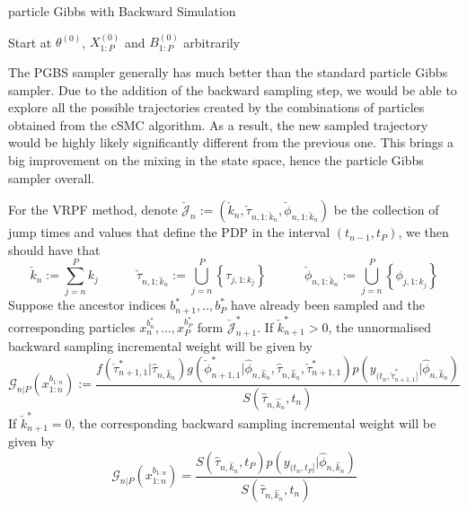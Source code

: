 \documentclass[12pt,a4paper]{article}
\begin{document}
\begin{algorithm}[htb!]
    \caption{particle Gibbs with Backward Simulation}\label{Alg: PGBSi}
    Start at $\theta^{(0)}$, $X_{1:P}^{(0)}$ and $B_{1:P}^{(0)}$ arbitrarily\;
\end{algorithm}
The PGBS sampler generally has much better than the standard particle Gibbs sampler. Due to the addition of the backward sampling step, we would be able to explore all the possible trajectories created by the combinations of particles obtained from the cSMC algorithm. As a result, the new sampled trajectory would be highly likely significantly different from the previous one. This brings a big improvement on the mixing in the state space, hence the particle Gibbs sampler overall. 

For the VRPF method, denote \(\check{\mathcal{J}}_{n}:=(\check{k}_n,\check{\tau}_{n,1:\check{k}_n},\check{\phi}_{n,1:\check{k}_n})\) be the collection of jump times and values that define the PDP in the interval \((t_{n-1},t_P)\), we then should have that 
\begin{equation*}
    \check{k}_n := \sum_{j=n}^{P} k_j \quad\quad\quad \check{\tau}_{n,1:\check{k}_n} :=  \bigcup_{j=n}^{P} \left\{\tau_{j,1:k_j}\right\} \quad\quad\quad \check{\phi}_{n,1:\check{k}_n} :=  \bigcup_{j=n}^{P} \left\{\phi_{j,1:k_j}\right\}
\end{equation*}
Suppose the ancestor indices $b_{n+1}^{*},..,b_P^{*}$ have already been sampled and the corresponding particles \(x_{n}^{b_n^*},...,x_P^{b_P^*}\) form $\check{\mathcal{J}}_{n+1}^{*}$. If $\check{k}_{n+1}^{*}>0$, the unnormalised backward sampling incremental weight will be given by 
\begin{equation}
    \label{PMCMC - VRPF Backward Simulation Weight 1}
    \mathcal{G}_{n|P}(x_{1:n}^{b_{1:n}}) := \frac{f(\check{\tau}_{n+1,1}^{*}|\hat{\tau}_{n,\hat{k}_n})g(\check{\phi}_{n+1,1}^{*}|\hat{\phi}_{n,\hat{k}_n},\hat{\tau}_{n,\hat{k}_n},\check{\tau}_{n+1,1}^{*})p(y_{(t_n,\check{\tau}_{n+1,1}^{*}]}|\hat{\phi}_{n,\hat{k}_n})}{S(\hat{\tau}_{n,\hat{k}_n},t_n)}
\end{equation}
If $\check{k}_{n+1}^{*} = 0$, the corresponding backward sampling incremental weight will be given by 
\begin{equation}
    \label{PMCMC - VRPF Backward Simulation Weight 2}
    \mathcal{G}_{n|P}(x_{1:n}^{b_{1:n}}) = \frac{S(\hat{\tau}_{n,\hat{k}_n},t_P)p(y_{(t_n,t_P]}|\hat{\phi}_{n,\hat{k}_n})}{S(\hat{\tau}_{n,\hat{k}_n},t_n)}
\end{equation}
\end{document}

